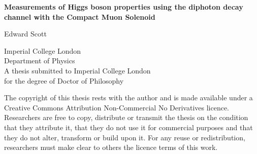 \begin{titlepage}
    \begin{center}
        \vspace*{2cm}
        
        \huge{\textbf{Measurements of Higgs boson properties using the diphoton decay channel with the Compact Muon Solenoid}}

        \vspace{1.5cm}
        \normalsize
        Edward Scott
        
        \vspace{0.5cm}
        Imperial College London\\
        Department of Physics\\

        \vspace{5cm}
        A thesis submitted to Imperial College London\\
        for the degree of Doctor of Philosophy\\
        
    \end{center}
\end{titlepage}

The copyright of this thesis rests with the author and is made available under a Creative Commons Attribution Non-Commercial No Derivatives licence. Researchers are free to copy, distribute or transmit the thesis on the condition that they attribute it, that they do not use it for commercial purposes and that they do not alter, transform or build upon it. For any reuse or redistribution, researchers must make clear to others the licence terms of this work.
